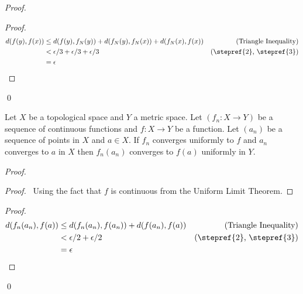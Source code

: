 \begin{proof}
    \pf
    \begin{proof}
        \pf
        \begin{align*}
            d(f(y),f(x)) & \leq d(f(y),f_N(y)) + d(f_N(y),f_N(x)) + d(f_N(x),f(x)) & (\text{Triangle Inequality}) \\
            & < \epsilon / 3 + \epsilon / 3 + \epsilon / 3 & (\text{\stepref{2}, \stepref{3}})\\
            & = \epsilon
        \end{align*}
    \end{proof}
    \qed
\end{proof}

\begin{proposition}
    Let $X$ be a topological space and $Y$ a metric space.  Let $(f_n : X \rightarrow Y)$ be a sequence of continuous functions and $f : X \rightarrow Y$ be a function.
    Let $(a_n)$ be a sequence of points in $X$ and $a \in X$. If $f_n$ converges uniformly to $f$ and $a_n$ converges to $a$ in $X$ then $f_n(a_n)$ converges to $f(a)$
    uniformly in $Y$.
\end{proposition}

\begin{proof}
    \pf
    \begin{proof}
        \pf\ Using the fact that $f$ is continuous from the Uniform Limit Theorem.
    \end{proof}
    \begin{proof}
        \pf
        \begin{align*}
            d(f_n(a_n),f(a)) & \leq d(f_n(a_n),f(a_n)) + d(f(a_n),f(a)) & (\text{Triangle Inequality}) \\
            & < \epsilon / 2 + \epsilon / 2 & (\text{\stepref{2}, \stepref{3}}) \\
            & = \epsilon
        \end{align*}
    \end{proof}
    \qed
\end{proof}

